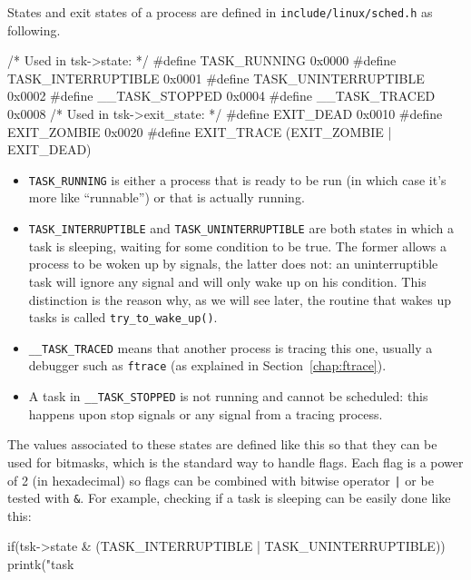 \documentclass[10pt, oneside]{book}
\begin{document}
States and exit states of a process are defined in \verb|include/linux/sched.h| as following.
\begin{code}
/* Used in tsk->state: */
#define TASK_RUNNING    0x0000
#define TASK_INTERRUPTIBLE  0x0001
#define TASK_UNINTERRUPTIBLE    0x0002
#define __TASK_STOPPED      0x0004
#define __TASK_TRACED     0x0008
/* Used in tsk->exit_state: */
#define EXIT_DEAD   0x0010
#define EXIT_ZOMBIE 0x0020
#define EXIT_TRACE  (EXIT_ZOMBIE | EXIT_DEAD)
\end{code}
\begin{itemize}
\item \verb|TASK_RUNNING| is either a process that is ready to be run
  (in which case it's more like ``runnable'') or that is actually
  running.

\item   \verb|TASK_INTERRUPTIBLE| and \verb|TASK_UNINTERRUPTIBLE| are both
  states in which a task is sleeping, waiting for some condition to
  be true. The former allows a process to be woken up by signals, the
  latter does not: an uninterruptible task will ignore any signal and
  will only wake up on his condition. This distinction is the reason
  why, as we will see later, the routine that wakes up tasks is called
  \verb|try_to_wake_up()|. 
\item \verb|__TASK_TRACED| means that another process is tracing this
  one, usually a debugger such as \verb|ftrace| (as explained in
  Section~\ref{chap:ftrace}).
\item A task in \verb|__TASK_STOPPED| is not running and cannot be
  scheduled: this happens upon stop signals or any signal from a
  tracing process.
\end{itemize}

The values associated to these states are defined like this so that they can be used for bitmasks, which is the standard way to handle flags. Each flag is a power of 2 (in hexadecimal) so flags can be combined with bitwise operator \verb&|& or be tested with \verb|&|. For example, checking if a task is sleeping can be easily done like this: 

\begin{code}
if(tsk->state & (TASK_INTERRUPTIBLE | TASK_UNINTERRUPTIBLE))
    printk("task %
\end{code}
\end{document}
